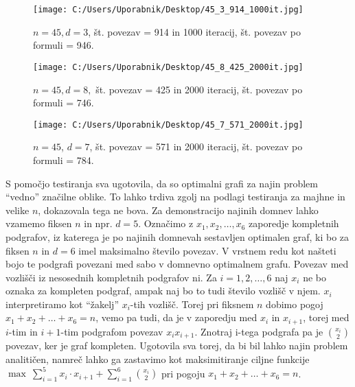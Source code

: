 \documentclass[12pt,a4paper]{amsart}
\theoremstyle{definition} %
\theoremstyle{plain} %
\begin{document}
\begin{figure}[h]
    \centering
    \texttt{[image: C:/Users/Uporabnik/Desktop/45\_3\_914\_1000it.jpg]} 
    \caption{$n = 45, d = 3$, št. povezav = 914 in 1000 iteracij, št. povezav po formuli = 946.}
    \label{fig:slika3}
\end{figure}

\break

\begin{figure}[h]
    \centering
    \texttt{[image: C:/Users/Uporabnik/Desktop/45\_8\_425\_2000it.jpg]} 
    \caption{$n = 45, d = 8,$ št. povezav = 425 in 2000 iteracij, št. povezav po formuli = 746.}
    \label{fig:slika3}
\end{figure}

\begin{figure}[h]
    \centering
    \texttt{[image: C:/Users/Uporabnik/Desktop/45\_7\_571\_2000it.jpg]} 
    \caption{$n = 45$, $d = 7$, št. povezav = 571 in 2000 iteracij, št. povezav po formuli = 784.}
    \label{fig:slika3}
\end{figure}

\noindent S pomočjo testiranja sva ugotovila, da so optimalni grafi za najin problem \enquote{vedno} značilne oblike.
To lahko trdiva zgolj na podlagi testiranja za majhne in velike $n$, dokazovala tega ne bova. 
Za demonstracijo najinih domnev lahko vzamemo fiksen $n$ in npr. $d = 5$. Označimo z $ x_1, x_2, \ldots, x_6 $ zaporedje kompletnih 
podgrafov, iz katerega je po najinih domnevah sestavljen optimalen graf, ki bo za fiksen $n$ in $d = 6$ imel maksimalno število povezav.
V vrstnem redu kot našteti bojo te podgrafi povezani med sabo v domnevno optimalnem grafu. Povezav med vozlišči iz nesosednih kompletnih podgrafov ni.
Za $i = 1, 2, \ldots, 6$ naj $x_i$ ne bo oznaka za kompleten podgraf, ampak naj bo to tudi število vozlišč v njem. $x_i$ interpretiramo kot \enquote{žakelj}
$x_i$-tih vozlišč.
Torej pri fiksnem $n$ dobimo pogoj $ x_1 + x_2 + \ldots + x_6 = n $, vemo pa tudi, da je v zaporedju med $x_i$ in $x_{i+1}$, torej 
med $i$-tim in $i+1$-tim podgrafom povezav $x_ix_{i+1}$.
Znotraj i-tega podgrafa pa je $\binom{x_i}{2}$ povezav, ker je graf kompleten. Ugotovila sva torej, da bi bil lahko najin problem 
analitičen, namreč lahko ga zastavimo kot maksimitiranje ciljne funkcije $\max\ \sum_{i=1}^{5} x_i \cdot x_{i+1} + \sum_{i=1}^{6} \binom{x_i}{2} $ 
pri pogoju $ x_1 + x_2 + \ldots + x_6 = n $.
\end{document}
